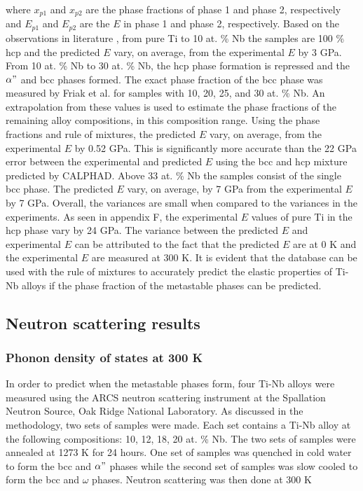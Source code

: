 \noindent where $x_{p1}$ and $x_{p2}$ are the phase fractions of phase 1 and phase 2, respectively and $E_{p1}$ and $E_{p2}$ are the $E$ in phase 1 and phase 2, respectively. Based on the observations in literature \cite{Friak2012,Timoshevskii2011,Friak2012,Karre2015}, from pure Ti to 10 at. \% Nb the samples are 100 \% hcp and the predicted $E$ vary, on average, from the experimental $E$ by 3 GPa. From 10 at. \% Nb to 30 at. \% Nb, the hcp phase formation is repressed and the $\alpha"$ and bcc phases formed. The exact phase fraction of the bcc phase was measured by Friak et al. \cite{Friak2012} for samples with 10, 20, 25, and 30 at. \% Nb. An extrapolation from these values is used to estimate the phase fractions of the remaining alloy compositions, in this composition range. Using the phase fractions and rule of mixtures, the predicted $E$ vary, on average, from the experimental $E$ by 0.52 GPa. This is significantly more accurate than the 22 GPa error between the experimental and predicted $E$ using the bcc and hcp mixture predicted by CALPHAD. Above 33 at. \% Nb the samples consist of the single bcc phase. The predicted $E$ vary, on average, by 7 GPa from the experimental $E$ by 7 GPa. Overall, the variances are small when compared to the variances in the experiments. As seen in appendix F, the experimental $E$ values of pure Ti in the hcp phase vary by 24 GPa. The variance between the predicted $E$ and experimental $E$ can be attributed to the fact that the predicted $E$ are at 0 K and the experimental $E$ are measured at 300 K. It is evident that the database can be used with the rule of mixtures to accurately predict the elastic properties of Ti-Nb alloys if the phase fraction of the metastable phases can be predicted.

\subsection{Neutron scattering results}

\subsubsection{Phonon density of states at 300 K}

In order to predict when the metastable phases form, four Ti-Nb alloys were measured using the ARCS neutron scattering instrument at the Spallation Neutron Source, Oak Ridge National Laboratory. As discussed in the methodology, two sets of samples were made. Each set contains a Ti-Nb alloy at the following compositions: 10, 12, 18, 20 at. \% Nb. The two sets of samples were annealed at 1273 K for 24 hours. One set of samples was quenched in cold water to form the bcc and $\alpha"$ phases while the second set of samples was slow cooled to form the bcc and $\omega$ phases. Neutron scattering was then done at 300 K

